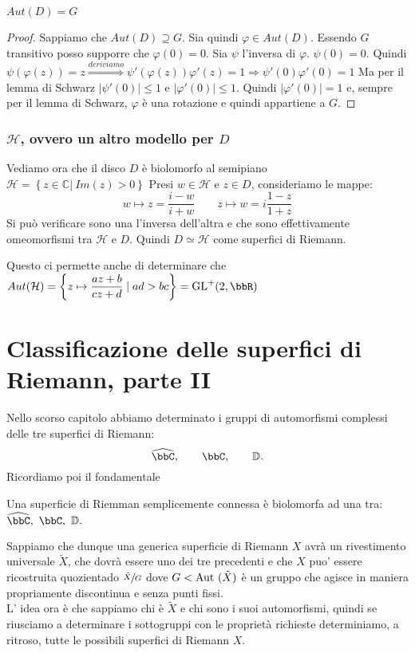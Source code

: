 \begin{proposizione}
$Aut(D)=G$
\end{proposizione}
\begin{proof}
Sappiamo che $Aut(D) \supseteq G$. Sia quindi $\varphi \in Aut(D)$. Essendo $G$ transitivo posso supporre che $\varphi(0)=0$.
Sia $\psi$ l'inversa di $\varphi$. $\psi (0)=0$. Quindi
$\psi (\varphi (z))=z \stackrel{deriviamo}{\Longrightarrow} \psi ' (\varphi (z)) \varphi '(z) =1 \Rightarrow \psi'(0) \varphi'(0) =1$
Ma per il lemma di Schwarz $|\psi'(0)| \leq 1$ e $|\varphi'(0)| \leq 1$. Quindi $|\varphi'(0)|=1$ e, sempre per il lemma di Schwarz,
$\varphi$ è una rotazione e quindi appartiene a $G$.
\end{proof}

\subsection {$\mathcal{H}$, ovvero un altro modello per $D$}

Vediamo ora che il disco $D$ è biolomorfo al semipiano $\mathcal{H} = \left \{ z \in \mathbb{C} | \ Im (z)>0 \right \}$
Presi $w \in \mathcal{H}$ e $z \in D$, consideriamo le mappe:
$$w \mapsto z=\frac{i-w}{i+w} \qquad z \mapsto w= i\frac{1-z}{1+z}$$
Si può verificare sono una l'inversa dell'altra e che sono effettivamente omeomorfismi tra $\mathcal{H}$ e $D$.
Quindi $D \simeq \mathcal{H}$ come superfici di Riemann.

Questo ci permette anche di determinare che $Aut( \mathcal{H}) = \left \{ z \mapsto \displaystyle{\frac{az+b}{cz+d}} \mid ad > bc \right \} = \GL^+ (2, \bbR)$


\chapter{Classificazione delle superfici di Riemann, parte II}

Nello scorso capitolo abbiamo determinato i gruppi di automorfismi complessi delle tre superfici di Riemann:
$$
\hat{\bbC},\qquad \bbC, \qquad \mathbb{D}.
$$
Ricordiamo poi il fondamentale
\begin{teorema}[Riemann] Una superficie di Riemman semplicemente connessa è biolomorfa ad una tra:
$\hat{\bbC},\ \bbC, \ \mathbb{D}. $
\end{teorema}
Sappiamo che dunque una generica superficie di Riemann $X$ avrà un rivestimento universale $\tilde{X}$, che dovrà essere uno dei tre precedenti e che $X$ puo' essere ricostruita quozientado $\sfrac{\tilde{X}}{G}$ dove $G<\text{Aut }(\tilde{X})$ è un gruppo che agisce in maniera propriamente discontinua e senza punti fissi.\\
L' idea ora è che sappiamo chi è $\tilde{X}$ e chi sono i suoi automorfismi, quindi se riusciamo a determinare i sottogruppi con le proprietà richieste determiniamo, a ritroso, tutte le possibili superfici di Riemann $X$.\\

